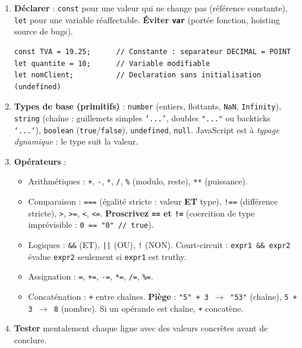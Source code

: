 \documentclass[11pt]{article}
\begin{document}
\begin{methode}
\begin{enumerate}
\item \textbf{Déclarer} : \texttt{const} pour une valeur qui ne change pas (référence constante), \texttt{let} pour une variable réaffectable. \textbf{Éviter \texttt{var}} (portée fonction, hoisting source de bugs).
      \begin{lstlisting}
const TVA = 19.25;      // Constante : separateur DECIMAL = POINT
let quantite = 10;      // Variable modifiable
let nomClient;          // Declaration sans initialisation (undefined)
      \end{lstlisting}
\item \textbf{Types de base (primitifs)} : \texttt{number} (entiers, flottants, \texttt{NaN}, \texttt{Infinity}), \texttt{string} (chaîne : guillemets simples \texttt{'...'}, doubles \texttt{"..."} ou backticks \texttt{`...`}), \texttt{boolean} (\texttt{true}/\texttt{false}), \texttt{undefined}, \texttt{null}. JavaScript est à \emph{typage dynamique} : le type suit la valeur.
\item \textbf{Opérateurs} :
      \begin{itemize}
      \item Arithmétiques : \texttt{+}, \texttt{-}, \texttt{*}, \texttt{/}, \texttt{\%} (modulo, reste), \texttt{**} (puissance).
      \item Comparaison : \texttt{===} (égalité stricte : valeur \textbf{ET} type), \texttt{!==} (différence stricte), \texttt{>}, \texttt{>=}, \texttt{<}, \texttt{<=}. \textbf{Proscrivez \texttt{==} et \texttt{!=}} (coercition de type imprévisible : \texttt{0 == "0" // true}).
      \item Logiques : \texttt{\&\&} (ET), \texttt{||} (OU), \texttt{!} (NON). Court-circuit : \texttt{expr1 \&\& expr2} évalue \texttt{expr2} seulement si \texttt{expr1} est truthy.
      \item Assignation : \texttt{=}, \texttt{+=}, \texttt{-=}, \texttt{*=}, \texttt{/=}, \texttt{\%=}.
      \item Concaténation : \texttt{+} entre chaînes. \textbf{Piège} : \texttt{"5" + 3 $\to$ "53"} (chaîne), \texttt{5 + 3 $\to$ 8} (nombre). Si un opérande est chaîne, \texttt{+} concatène.
      \end{itemize}
\item \textbf{Tester} mentalement chaque ligne avec des valeurs concrètes avant de conclure.
\end{enumerate}
\end{methode}
\end{document}
